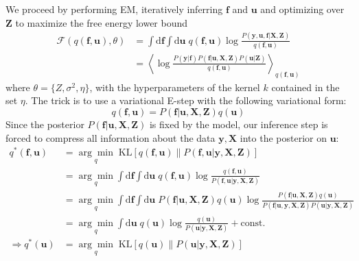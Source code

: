 \documentclass[a4paper]{article}
\begin{document}
We proceed by performing EM, iteratively inferring $\mathbf{f}$ and $\mathbf{u}$ and optimizing over $\mathbf{Z}$ to maximize the free energy lower bound
\begin{align*}
\mathcal{F}(q(\mathbf{f,u}),\theta) &= \int \textrm{d}\mathbf{f} \int \textrm{d}\mathbf{u}\; q(\mathbf{f,u}) \log \frac{P(\mathbf{y,u,f}|\mathbf{X,Z})}{q(\mathbf{f,u})} \\
&= \left\langle \log \frac{P(\mathbf{y}|\mathbf{f}) P(\mathbf{f}|\mathbf{u,X,Z}) P(\mathbf{u}|\mathbf{Z})}{q(\mathbf{f,u})} \right\rangle_{q(\mathbf{f,u})}
\end{align*}
where $\theta=\{Z,\sigma^2,\eta\}$, with the hyperparameters of the kernel $k$ contained in the set $\eta$. The trick is to use a variational E-step with the following variational form:
\[ q(\mathbf{f,u}) = P(\mathbf{f}|\mathbf{u,X,Z})q(\mathbf{u}) \]
Since the posterior $P(\mathbf{f}|\mathbf{u,X,Z})$ is fixed by the model, our inference step is forced to compress all information about the data $\mathbf{y},\mathbf{X}$ into the posterior on $\mathbf{u}$:
\begin{align*}
q^*(\mathbf{f,u}) &= \underset{q}{\arg\min}\; \textrm{KL}\left[ q(\mathbf{f,u}) \| P(\mathbf{f,u}|\mathbf{y,X,Z}) \right] \\
&= \underset{q}{\arg\min} \int \textrm{d}\mathbf{f} \int \textrm{d}\mathbf{u}\; q(\mathbf{f,u}) \log \frac{q(\mathbf{f,u})}{P(\mathbf{f,u}|\mathbf{y,X,Z})} \\
&= \underset{q}{\arg\min} \int \textrm{d}\mathbf{f} \int \textrm{d}\mathbf{u}\; P(\mathbf{f}|\mathbf{u,X,Z})q(\mathbf{u}) \log \frac{P(\mathbf{f}|\mathbf{u,X,Z})q(\mathbf{u})}{P(\mathbf{f}|\mathbf{u,y,X,Z})P(\mathbf{u}|\mathbf{y,X,Z})} \\
&= \underset{q}{\arg\min} \int \textrm{d}\mathbf{u}\; q(\mathbf{u}) \log \frac{q(\mathbf{u})}{P(\mathbf{u}|\mathbf{y,X,Z})} + \text{const.} \\
\Rightarrow q^*(\mathbf{u}) &= \underset{q}{\arg\min}\; \textrm{KL}\left[ q(\mathbf{u}) \| P(\mathbf{u}|\mathbf{y,X,Z}) \right]
\end{align*}
\end{document}
